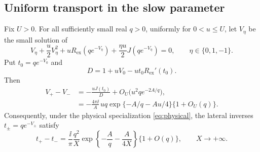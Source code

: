 \subsection{Uniform transport in the slow parameter}

\begin{proposition}
\label{prop:Stokes-transport}
Fix $U>0$. For all sufficiently small real $q>0$, uniformly for
$0<u\le U$, let $V_\eta$ be the small solution of
\begin{equation}\label{eq:eta-inverse}
 V_\eta+\frac u2V_\eta^2
 +uR_{\mathrm{ex}}(qe^{-V_\eta})
 +\frac{\eta u}{2}J(qe^{-V_\eta})=0,\qquad \eta\in\{0,1,-1\}.
\end{equation}
Put $t_0=qe^{-V_0}$ and
\[
 D=1+uV_0-ut_0R_{\mathrm{ex}}'(t_0).
\]
Then
\begin{align}
 V_+-V_-&=-\frac{uJ(t_0)}{D}
                  +O_U\bigl(u^2q e^{-2A/q}\bigr),
                  \label{eq:jump-linear-transport}\\
 &=-\frac{4\pi\ii}{A}\,u q
       \exp\{-A/q-Au/4\}\{1+O_U(q)\}.
                  \label{eq:jump-q-transport}
\end{align}
Consequently, under the physical specialization \eqref{eq:physical},
the lateral inverses $t_\pm=qe^{-V_\pm}$ satisfy
\begin{equation}\label{eq:physical-jump}
 t_+-t_-=\frac{\ii}{\pi}\frac{q^2}{X}
       \exp\left\{-\frac Aq-\frac{A}{4X}\right\}
       \{1+O(q)\},\qquad X\to+\infty.
\end{equation}
\end{proposition}
